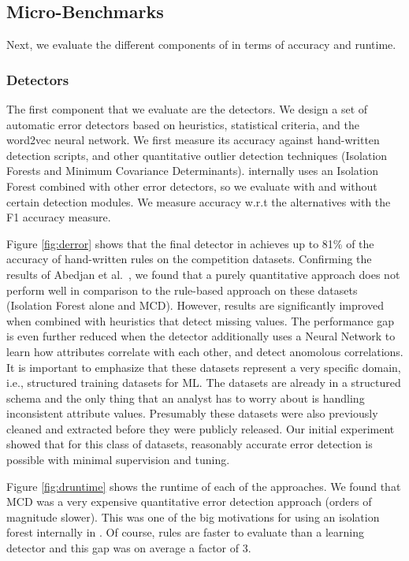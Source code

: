 \subsection{Micro-Benchmarks}
Next, we evaluate the different components of \sys in terms of accuracy and runtime.

\subsubsection{Detectors}
The first component that we evaluate are the detectors. We design a set of automatic error detectors based on heuristics, statistical criteria, and the word2vec neural network. We first measure its accuracy against hand-written detection scripts, and other quantitative outlier detection techniques (Isolation Forests and Minimum Covariance Determinants).
\sys internally uses an Isolation Forest combined with other error detectors, so we evaluate \sys with and without certain detection modules.
We measure accuracy w.r.t the alternatives with the F1 accuracy measure.

 Figure  \ref{fig:derror} shows that the final detector in \sys achieves up to 81\% of the accuracy of hand-written rules on the competition datasets.
Confirming the results of Abedjan et al.~\cite{DBLP:journals/pvldb/AbedjanCDFIOPST16}, we found that a 
purely quantitative approach does not perform well in comparison to the rule-based approach on these datasets (Isolation Forest alone and MCD).
However, results are significantly improved when combined with heuristics that detect missing values. 
The performance gap is even further reduced when the detector additionally uses a Neural Network to learn how attributes correlate with each other, and detect anomolous correlations.
It is important to emphasize that these datasets represent a very specific domain, i.e., structured training datasets for ML.
The datasets are already in a structured schema and the only thing that an analyst has to worry about is handling inconsistent attribute values.
Presumably these datasets were also previously cleaned and extracted before they were publicly released.
Our initial experiment showed that for this class of datasets, reasonably accurate error detection is possible with minimal supervision and tuning.

 Figure  \ref{fig:druntime} shows the runtime of each of the approaches.
 We found that MCD was a very expensive quantitative error detection approach (orders of magnitude slower).
 This was one of the big motivations for using an isolation forest internally in \sys.
 Of course, rules are faster to evaluate than a learning detector and this gap was on average a factor of 3.
 
